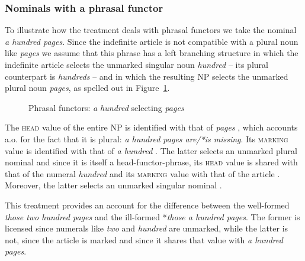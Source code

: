 \documentclass[output=paper
                ,modfonts
                ,nonflat
	        ,collection
	        ,collectionchapter
	        ,collectiontoclongg
 	        ,biblatex
                ,babelshorthands
                ,newtxmath
                ,draftmode
                ,colorlinks, citecolor=brown
]{./langsci/langscibook}
\begin{document}
        
\subsubsection{Nominals with a phrasal functor} 
\label{sec-phrasal-spec}


To illustrate how the treatment deals with phrasal functors we 
take the nominal \emph{a hundred pages}. Since the indefinite article is not 
compatible with a plural noun like \emph{pages} we assume that this phrase  
has a left branching structure in which the indefinite article selects 
the unmarked singular noun \emph{hundred} -- its plural counterpart is \emph{hundreds} --  
and in which the resulting NP selects the unmarked plural noun 
\emph{pages}, as spelled out in Figure~\ref{glorie}. 
 
\begin{figure}
\centering
{}
\caption{\label{glorie} Phrasal functors: \emph{a hundred} selecting \emph{pages}}
\end{figure}

The \textsc{head} value of the entire NP is identified with that 
of \emph{pages} , which accounts a.o. for the fact that it is plural:
\emph{a hundred pages are/*is missing}. 
Its \textsc{marking} value is identified with that of \emph{a hundred} 
. The latter selects an unmarked plural nominal  and 
since it is itself a head-functor-phrase, its \textsc{head} value is shared with 
that of the numeral \emph{hundred}  and its \textsc{marking} value 
with that of the article . Moreover, the latter selects an unmarked 
singular nominal .
 
This treatment provides an account for the difference between 
the well-formed \emph{those two hundred pages} and the 
ill-formed *\emph{those a hundred pages}. The former is licensed since numerals 
like \emph{two} and \emph{hundred} are unmarked, while the latter is not, since 
the article is marked and since it shares that value with \emph{a hundred pages}.  
\end{document}
